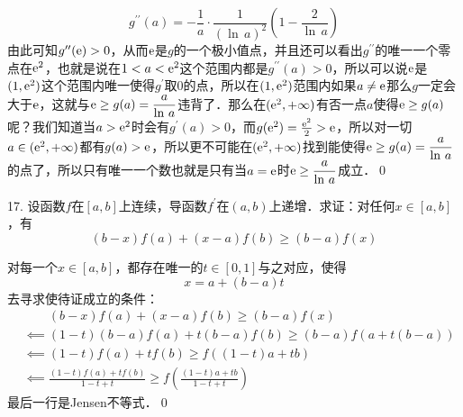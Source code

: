 \begin{equation}
    g^{\prime\prime}(a) = -\frac{1}{a} \cdot \frac{1}{\left( \ln \, a\right)^2} \left(1 - \frac{2}{\ln \, a}\right)
\end{equation}
由此可知$g^{\prime\prime}(\mathrm{e}) > 0$，从而$\mathrm{e}$是$g$的一个极小值点，并且还可以看出$g^{\prime\prime}$的唯一一个零点在$\mathrm{e}^2$，也就是说在$1 < a < \mathrm{e}^2$这个范围内都是$g^{\prime\prime}(a)> 0$，所以可以说$\mathrm{e}$是$(1,\mathrm{e}^2)$这个范围内唯一使得$g^{\prime}$取$0$的点，所以在$(1,\mathrm{e}^2)$范围内如果$a \neq \mathrm{e}$那么$g$一定会大于$\mathrm{e}$，这就与$\mathrm{e} \geq g(a) = \displaystyle\frac{a}{\ln \, a}$违背了．那么在$(\mathrm{e}^2, +\infty)$有否一点$a$使得$\mathrm{e} \geq g(a)$呢？我们知道当$a > \mathrm{e}^2$时会有$g^{\prime}(a) > 0$，而$g(\mathrm{e}^2) = \frac{\mathrm{e}^2}{2} > \mathrm{e}$，所以对一切$a \in (\mathrm{e}^2, +\infty)$都有$g(a) > \mathrm{e}$，所以更不可能在$(\mathrm{e}^2, +\infty)$找到能使得$\mathrm{e} \geq g(a) = \displaystyle\frac{a}{\ln \, a}$的点了，所以只有唯一一个数也就是只有当$a = \mathrm{e}$时$\mathrm{e} \geq \displaystyle\frac{a}{\ln \, a}$成立．\qed\bigskip

17. 设函数$f$在$[a,b]$上连续，导函数$f^\prime$在$(a,b)$上递增．求证：对任何$x \in [a,b]$，有
\begin{equation*}
    (b-x)f(a)+(x-a)f(b) \geq (b-a)f(x)
\end{equation*}

\prove 对每一个$x \in [a,b]$，都存在唯一的$t \in [0,1]$与之对应，使得
\begin{equation}
    x = a + (b-a)t
\end{equation}
去寻求使待证成立的条件：
\begin{align}
    &\mathrel{\phantom{\impliedby}} (b-x)f(a)+(x-a)f(b) \geq (b-a)f(x) \\
    &\impliedby (1-t)(b-a)f(a)+t(b-a)f(b) \geq (b-a)f(a+t(b-a)) \\
    &\impliedby (1-t)f(a) + t f(b) \geq f((1-t)a+t b) \\
    &\impliedby \frac{\left(1-t\right)f(a) + t f(b)}{1-t+t} \geq f \left(\frac{\left(1-t\right) a + t b}{1-t + t}\right)
\end{align}
最后一行是Jensen不等式．\qed\bigskip